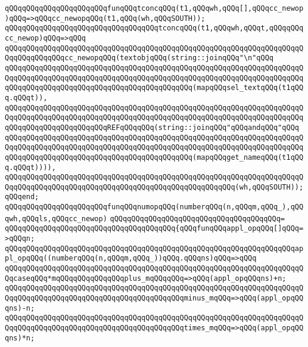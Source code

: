 \newline
\verb|qQQqqQQqqQQqqQQqqQQqqQQqfunqQQqtconcqQQq(t1,qQQqwh,qQQq[],qQQqcc_newop)qQQq=>qQQqcc_newopqQQq(t1,qQQq(wh,qQQqSOUTH));|\newline
\verb|qQQqqQQqqQQqqQQqqQQqqQQqqQQqqQQqqQQqtconcqQQq(t1,qQQqwh,qQQqt,qQQqqQQqcc_newop)qQQq=>qQQq|\newline
\verb|qQQqqQQqqQQqqQQqqQQqqQQqqQQqqQQqqQQqqQQqqQQqqQQqqQQqqQQqqQQqqQQqqQQqqQQqqQQqqQQqqQQqcc_newopqQQq(textobjqQQq(string::joinqQQq"\n"qQQq|\newline
\verb|qQQqqQQqqQQqqQQqqQQqqQQqqQQqqQQqqQQqqQQqqQQqqQQqqQQqqQQqqQQqqQQqqQQqqQQqqQQqqQQqqQQqqQQqqQQqqQQqqQQqqQQqqQQqqQQqqQQqqQQqqQQqqQQqqQQqqQQqqQQqqQQqqQQqqQQqqQQqqQQqqQQqqQQqqQQqqQQqqQQqqQQq(mapqQQqsel_textqQQq(t1qQQq.qQQqt)),|\newline
\verb|qQQqqQQqqQQqqQQqqQQqqQQqqQQqqQQqqQQqqQQqqQQqqQQqqQQqqQQqqQQqqQQqqQQqqQQqqQQqqQQqqQQqqQQqqQQqqQQqqQQqqQQqqQQqqQQqqQQqqQQqqQQqqQQqqQQqqQQqqQQqqQQqqQQqqQQqqQQqqQQqqQQqREFqQQqqQQq(string::joinqQQq"qQQqandqQQq"qQQq|\newline
\verb|qQQqqQQqqQQqqQQqqQQqqQQqqQQqqQQqqQQqqQQqqQQqqQQqqQQqqQQqqQQqqQQqqQQqqQQqqQQqqQQqqQQqqQQqqQQqqQQqqQQqqQQqqQQqqQQqqQQqqQQqqQQqqQQqqQQqqQQqqQQqqQQqqQQqqQQqqQQqqQQqqQQqqQQqqQQqqQQqqQQqqQQq(mapqQQqget_nameqQQq(t1qQQq.qQQqt)))),|\newline
\verb|qQQqqQQqqQQqqQQqqQQqqQQqqQQqqQQqqQQqqQQqqQQqqQQqqQQqqQQqqQQqqQQqqQQqqQQqqQQqqQQqqQQqqQQqqQQqqQQqqQQqqQQqqQQqqQQqqQQqqQQqqQQq(wh,qQQqSOUTH));qQQqend;|\newline
\newline
\verb|qQQqqQQqqQQqqQQqqQQqqQQqfunqQQqnumopqQQq(numberqQQq(n,qQQqm,qQQq_),qQQqwh,qQQqls,qQQqcc_newop)|\newline
\verb|qQQqqQQqqQQqqQQqqQQqqQQqqQQqqQQqqQQqqQQq=|\newline
\verb|qQQqqQQqqQQqqQQqqQQqqQQqqQQqqQQqqQQqqQQq{qQQqfunqQQqappl_opqQQq[]qQQq=>qQQqn;|\newline
\verb|qQQqqQQqqQQqqQQqqQQqqQQqqQQqqQQqqQQqqQQqqQQqqQQqqQQqqQQqqQQqqQQqqQQqappl_opqQQq((numberqQQq(n,qQQqm,qQQq_))qQQq.qQQqns)qQQq=>qQQq|\newline
\verb|qQQqqQQqqQQqqQQqqQQqqQQqqQQqqQQqqQQqqQQqqQQqqQQqqQQqqQQqqQQqqQQqqQQqqQQqcaseqQQq*mqQQqqQQqqQQqqQQqplus_mqQQqqQQq=>qQQq(appl_opqQQqns)+n;|\newline
\verb|qQQqqQQqqQQqqQQqqQQqqQQqqQQqqQQqqQQqqQQqqQQqqQQqqQQqqQQqqQQqqQQqqQQqqQQqqQQqqQQqqQQqqQQqqQQqqQQqqQQqqQQqqQQqqQQqminus_mqQQq=>qQQq(appl_opqQQqns)-n;|\newline
\verb|qQQqqQQqqQQqqQQqqQQqqQQqqQQqqQQqqQQqqQQqqQQqqQQqqQQqqQQqqQQqqQQqqQQqqQQqqQQqqQQqqQQqqQQqqQQqqQQqqQQqqQQqqQQqqQQqtimes_mqQQq=>qQQq(appl_opqQQqns)*n;|\newline
